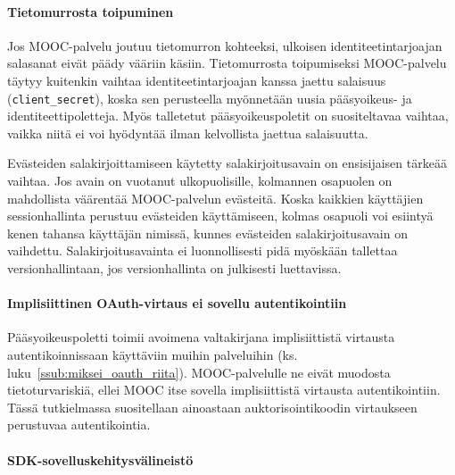 \documentclass[finnish,gradu]{tktltiki}
\begin{document}

  \paragraph{Tietomurrosta toipuminen} \hfill %
  \label{par:tietomurrosta_toipuminen}

  Jos MOOC-palvelu joutuu tietomurron kohteeksi, ulkoisen identiteetintarjoajan salasanat eivät päädy vääriin käsiin. Tietomurrosta toipumiseksi MOOC-palvelu täytyy kuitenkin vaihtaa identiteetintarjoajan kanssa jaettu salaisuus (\verb!client_secret!), koska sen perusteella myönnetään uusia pääsyoikeus- ja identiteettipoletteja. Myös talletetut pääsyoikeuspoletit on suositeltavaa vaihtaa, vaikka niitä ei voi hyödyntää ilman kelvollista jaettua salaisuutta.

  Evästeiden salakirjoittamiseen käytetty salakirjoitusavain on ensisijaisen tärkeää vaihtaa. Jos avain on vuotanut ulkopuolisille, kolmannen osapuolen on mahdollista väärentää MOOC-palvelun evästeitä. Koska kaikkien käyttäjien sessionhallinta perustuu evästeiden käyttämiseen, kolmas osapuoli voi esiintyä kenen tahansa käyttäjän nimissä, kunnes evästeiden salakirjoitusavain on vaihdettu. Salakirjoitusavainta ei luonnollisesti pidä myöskään tallettaa versionhallintaan, jos versionhallinta on julkisesti luettavissa.


  \paragraph{Implisiittinen OAuth-virtaus ei sovellu autentikointiin} \hfill %
  \label{par:implisiittisen_oauth_virtauksen_ei_sovellu_autentikointiin}

  Pääsyoikeuspoletti toimii avoimena valtakirjana implisiittistä virtausta autentikoinnissaan käyttäviin muihin palveluihin (ks. luku~\ref{ssub:miksei_oauth_riita}). MOOC-palvelulle ne eivät muodosta tietoturvariskiä, ellei MOOC itse sovella implisiittistä virtausta autentikointiin. Tässä tutkielmassa suositellaan ainoastaan auktorisointikoodin virtaukseen perustuvaa autentikointia.



  \paragraph{SDK-sovelluskehitysvälineistö} \hfill %
  \label{par:sdk_sovelluskehitysvälineistö}
\end{document}
